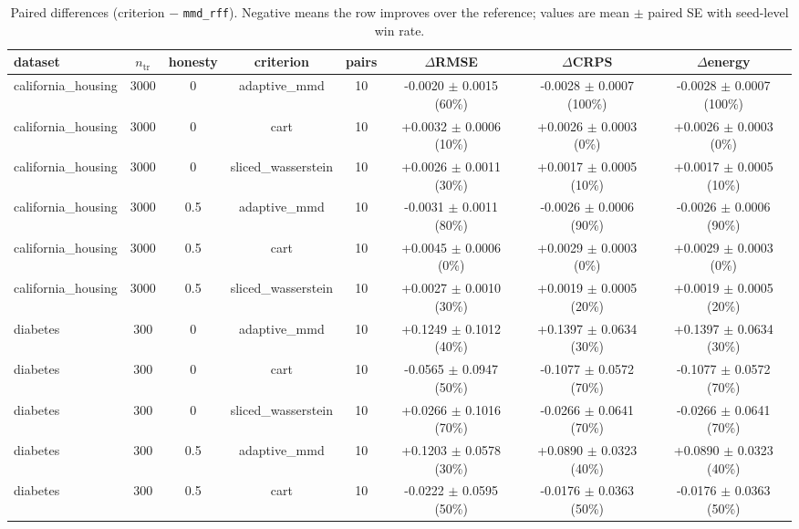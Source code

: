 \begin{table}[h]
  \centering
  \caption{Paired differences (criterion $-$ \texttt{mmd\_rff}). Negative means the row improves over the reference; values are mean $\pm$ paired SE with seed-level win rate.}
  \label{tab:modification}
  \begin{adjustbox}{max width=\textwidth}
  \begin{tabular}{lccccccc}
    \toprule
    dataset & $n_{\mathrm{tr}}$ & honesty & criterion & pairs & $\Delta$RMSE & $\Delta$CRPS & $\Delta$energy \\
    \midrule
    california\_housing & 3000 & 0 & adaptive\_mmd & 10 & -0.0020 $\pm$ 0.0015 (60\%) & -0.0028 $\pm$ 0.0007 (100\%) & -0.0028 $\pm$ 0.0007 (100\%) \\
    california\_housing & 3000 & 0 & cart & 10 & +0.0032 $\pm$ 0.0006 (10\%) & +0.0026 $\pm$ 0.0003 (0\%) & +0.0026 $\pm$ 0.0003 (0\%) \\
    california\_housing & 3000 & 0 & sliced\_wasserstein & 10 & +0.0026 $\pm$ 0.0011 (30\%) & +0.0017 $\pm$ 0.0005 (10\%) & +0.0017 $\pm$ 0.0005 (10\%) \\
    california\_housing & 3000 & 0.5 & adaptive\_mmd & 10 & -0.0031 $\pm$ 0.0011 (80\%) & -0.0026 $\pm$ 0.0006 (90\%) & -0.0026 $\pm$ 0.0006 (90\%) \\
    california\_housing & 3000 & 0.5 & cart & 10 & +0.0045 $\pm$ 0.0006 (0\%) & +0.0029 $\pm$ 0.0003 (0\%) & +0.0029 $\pm$ 0.0003 (0\%) \\
    california\_housing & 3000 & 0.5 & sliced\_wasserstein & 10 & +0.0027 $\pm$ 0.0010 (30\%) & +0.0019 $\pm$ 0.0005 (20\%) & +0.0019 $\pm$ 0.0005 (20\%) \\
    diabetes & 300 & 0 & adaptive\_mmd & 10 & +0.1249 $\pm$ 0.1012 (40\%) & +0.1397 $\pm$ 0.0634 (30\%) & +0.1397 $\pm$ 0.0634 (30\%) \\
    diabetes & 300 & 0 & cart & 10 & -0.0565 $\pm$ 0.0947 (50\%) & -0.1077 $\pm$ 0.0572 (70\%) & -0.1077 $\pm$ 0.0572 (70\%) \\
    diabetes & 300 & 0 & sliced\_wasserstein & 10 & +0.0266 $\pm$ 0.1016 (70\%) & -0.0266 $\pm$ 0.0641 (70\%) & -0.0266 $\pm$ 0.0641 (70\%) \\
    diabetes & 300 & 0.5 & adaptive\_mmd & 10 & +0.1203 $\pm$ 0.0578 (30\%) & +0.0890 $\pm$ 0.0323 (40\%) & +0.0890 $\pm$ 0.0323 (40\%) \\
    diabetes & 300 & 0.5 & cart & 10 & -0.0222 $\pm$ 0.0595 (50\%) & -0.0176 $\pm$ 0.0363 (50\%) & -0.0176 $\pm$ 0.0363 (50\%) \\

\end{tabular}
\end{adjustbox}
\end{table}
